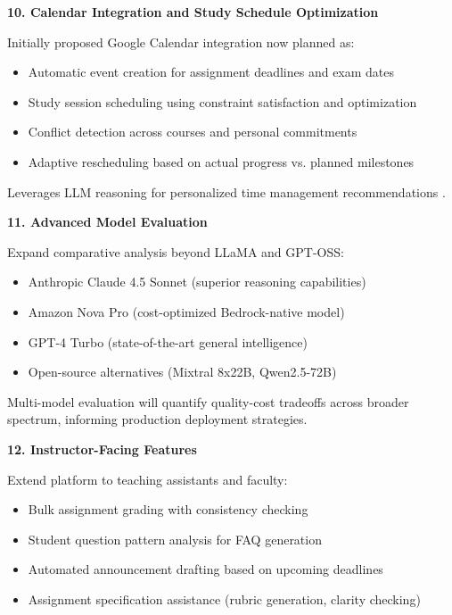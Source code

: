 \documentclass{article}
\begin{document}
\textbf{10. Calendar Integration and Study Schedule Optimization}

Initially proposed Google Calendar integration now planned as:

\begin{itemize}
    \item Automatic event creation for assignment deadlines and exam dates
    \item Study session scheduling using constraint satisfaction and optimization
    \item Conflict detection across courses and personal commitments
    \item Adaptive rescheduling based on actual progress vs. planned milestones
\end{itemize}

Leverages LLM reasoning for personalized time management recommendations \cite{anthropic2025multiagent}.

\textbf{11. Advanced Model Evaluation}

Expand comparative analysis beyond LLaMA and GPT-OSS:

\begin{itemize}
    \item Anthropic Claude 4.5 Sonnet (superior reasoning capabilities)
    \item Amazon Nova Pro (cost-optimized Bedrock-native model)
    \item GPT-4 Turbo (state-of-the-art general intelligence)
    \item Open-source alternatives (Mixtral 8x22B, Qwen2.5-72B)
\end{itemize}

Multi-model evaluation will quantify quality-cost tradeoffs across broader spectrum, informing production deployment strategies.

\textbf{12. Instructor-Facing Features}

Extend platform to teaching assistants and faculty:

\begin{itemize}
    \item Bulk assignment grading with consistency checking
    \item Student question pattern analysis for FAQ generation
    \item Automated announcement drafting based on upcoming deadlines
    \item Assignment specification assistance (rubric generation, clarity checking)
\end{itemize}
\end{document}
